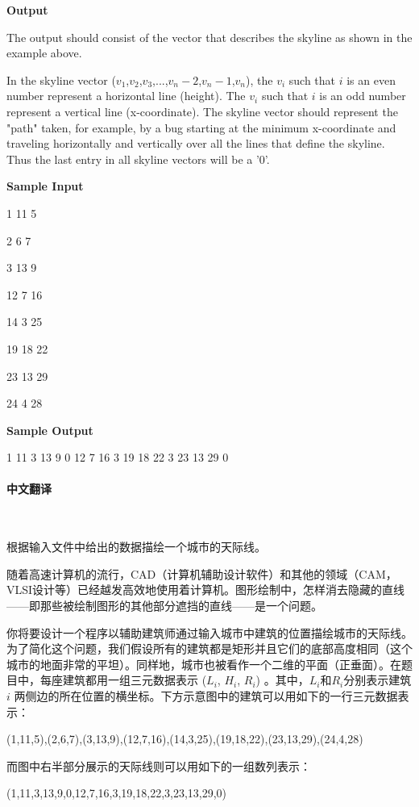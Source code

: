 \documentclass[a4paper]{ctexart}
\begin{document}
	\textbf{Output}

	The output should consist of the vector that describes the skyline as shown in the example above.
	
	In the skyline vector ($v_1$,$v_2$,$v_3$,...,$v_n-2$,$v_n-1$,$v_n$), the $v_i$ such that $i$ is an even number represent a horizontal line (height). The $v_i$ such that $i$ is an odd number represent a vertical line (x-coordinate). The skyline vector should represent the "path" taken, for example, by a bug starting at the minimum x-coordinate and traveling horizontally and vertically over all the lines that define the skyline. Thus the last entry in all skyline vectors will be a '0'.
	
	\textbf{Sample Input}

	1 11 5

	2 6 7

	3 13 9

	12 7 16

	14 3 25

	19 18 22

	23 13 29

	24 4 28

	\textbf{Sample Output}

	1 11 3 13 9 0 12 7 16 3 19 18 22 3 23 13 29 0



	\paragraph{中文翻译}~

	根据输入文件中给出的数据描绘一个城市的天际线。

	随着高速计算机的流行，CAD（计算机辅助设计软件）和其他的领域（CAM，VLSI设计等）已经越发高效地使用着计算机。图形绘制中，怎样消去隐藏的直线——即那些被绘制图形的其他部分遮挡的直线——是一个问题。

	你将要设计一个程序以辅助建筑师通过输入城市中建筑的位置描绘城市的天际线。为了简化这个问题，我们假设所有的建筑都是矩形并且它们的底部高度相同（这个城市的地面非常的平坦）。同样地，城市也被看作一个二维的平面（正垂面）。在题目中，每座建筑都用一组三元数据表示 ($L_i$, $H_i$, $R_i$) 。其中，$L_i$和$R_i$分别表示建筑 $i$ 两侧边的所在位置的横坐标。下方示意图中的建筑可以用如下的一行三元数据表示：

	(1,11,5),(2,6,7),(3,13,9),(12,7,16),(14,3,25),(19,18,22),(23,13,29),(24,4,28)

	而图中右半部分展示的天际线则可以用如下的一组数列表示：

	(1,11,3,13,9,0,12,7,16,3,19,18,22,3,23,13,29,0)
	
\end{document}
